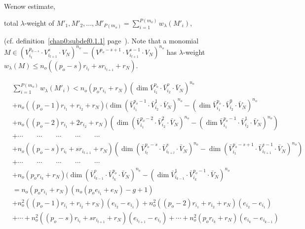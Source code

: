 We\pageoriginale now estimate, 

total $\lambda$-weight of $M'_1, M'_2,\ldots, M'_{P(m_o)}
=\sum\limits_{i=1}^{P(m_o)} w_{\lambda} (M'_i)$, 

\noindent
(cf. definition~\ref{chap0:subdef0.1.1} 
page~\pageref{chap0:subdef0.1.1}). Note that a monomial   
$M \in (V^{p_{0-s}}_{i_t} \cdot V^s_{i_{t+1}} \cdot V_N)^{n_o}
- (V^{p_o - s+1} \cdot V^{s-1}_{i_{t+1}} \cdot V_N)^{n_o}$
 has $\lambda$-weight $w_{\lambda}(M) \le n_o ((p_o - s) r_{i_{t}} +
 sr_{i_{t+1}} + r_N)$.  

\begin{landscape}
\begin{align*}
& \sum\limits_{i=1}^{P(m_o)} w_{\lambda} (M'_i) < n_o (p_o r_{i_{1}} +
r_N) (\dim \bar{V}^{p_o}_{i_{1}} \cdot  \bar{V}^o_{i_{2}}\cdot \bar{V}_N)^{n_o}\\
& + n_o ((p_o-1) r_{i_{1}} +  r_{i_{2}} + r_N)  (\dim
(\bar{V}^{p_o-1}_{i_{1}} \cdot \bar{V}^{1}_{i_{2}} \cdot  \bar{V}_N)^{n_o} - (\dim
\bar{V}^{p_o}_{i_{1}} \cdot  \bar{V}^{0}_{i_{2}} \cdot
\bar{V}_N)^{n_o}\\
& + n_o ((p_o-2) r_{i_{1}} +  2r_{i_{2}} + r_N)  (\dim
(\bar{V}^{p_o-2}_{i_{1}} \cdot \bar{V}^{2}_{i_{2}}\cdot  \bar{V}_N)^{n_o} - (\dim
\bar{V}^{p_o-1}_{i_{1}}  \cdot \bar{V}^{1}_{i_{2}} \cdot  \bar{V}_N)^{n_o})\\
& + \cdots \qquad \cdots \qquad \cdots \qquad \cdots \qquad\cdots\\
& + n_o ((p_o-s) r_{i_{t}} + sr_{i_{t+1}} + r_N) (\dim
(\bar{V}^{p_o-s}_{i_{t}} \cdot \bar{V}^s_{i_{t+l}} \cdot
\bar{V}_N)^{n_o} - \dim (\bar{V}^{p_o-s+1}_{i_{1}}
\cdot \bar{V}^{s-1}_{i_{t+1}} \cdot \bar{V}_N)^{n_o})\\
& + \cdots \qquad \cdots \qquad \cdots \qquad \cdots \qquad\cdots\\
& + n_o (p_o r_{i_{k}} + r_N) (\dim (\bar{V}^o_{i_{k-1}} \cdot
\bar{V}^{p_o}_{i_{k}} \cdot  \bar{V}_N)^{n_o}  - (\dim
\bar{V}^{1}_{i_{k-1}} \cdot  \bar{V}^{p_o-1}_{i_{k}}  \cdot \bar{V}_N)^{n_o} \\ 
& = n_o (p_o r_{i{_1}} + r_N) (n_o (p_o e_{i{_1}} + e_N)- g+1)\\
& + n_o^2 ((p_o-1) r_{i_1} + r_{i_2} + r_N) (e_{i_2} - e_{i_1}) +
n_o^2 ((p_o-2) r_{i_1} + r_{i_2} + r_N) (e_{i_2} - e_{i_1})\\
&  + \cdots +  n_o^2 ((p_o-s) r_{i_t} + sr_{i_{t+1}} + r_N)
(e_{i_{t+1}} - e_{i_{t}}) + \cdots + n_o^2 (p_o r_{i_k} + r_N) (
e_{i_k} -  e_{i_{k-1}})
\end{align*}
\end{landscape}
